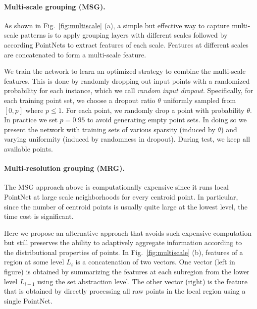 \paragraph{Multi-scale grouping (MSG).} As shown in Fig.~\ref{fig:multiscale} (a), a simple but effective way to capture multi-scale patterns is to apply grouping layers with different scales followed by according PointNets to extract features of each scale. Features at different scales are concatenated to form a multi-scale feature.%

We train the network to learn an optimized strategy to combine the multi-scale features. This is done by randomly dropping out input points with a randomized probability for each instance, which we call \emph{random input dropout}. Specifically, for each training point set, we choose a dropout ratio $\theta$ uniformly sampled from $[0,p]$ where $p\leq1$. For each point, we randomly drop a point with probability $\theta$. In practice we set $p=0.95$ to avoid generating empty point sets. In doing so we present the network with training sets of various sparsity (induced by $\theta$) and varying uniformity (induced by randomness in dropout). During test, we keep all available points.

\vspace{-0.3cm}
\paragraph{Multi-resolution grouping (MRG).} The MSG approach above is computationally expensive since it runs local PointNet at large scale neighborhoods for every centroid point. In particular, since the number of centroid points is usually quite large at the lowest level, the time cost is significant. %

Here we propose an alternative approach that avoids such expensive computation but still preserves the ability to adaptively aggregate information according to the distributional properties of points.
In Fig.~\ref{fig:multiscale} (b), features of a region at some level $L_i$ is a concatenation of two vectors. One vector (left in figure) is obtained by summarizing the features at each subregion from the lower level $L_{i-1}$ using the set abstraction level. The other vector (right) is the feature that is obtained by directly processing all raw points in the local region using a single PointNet. 

